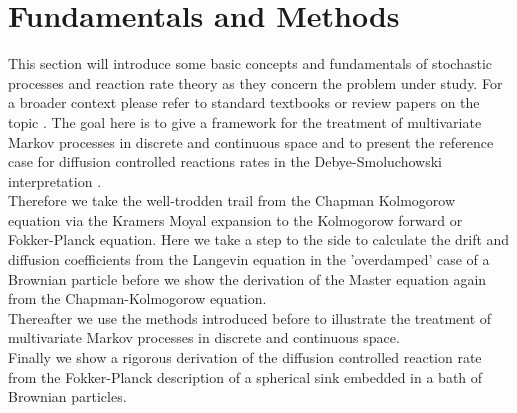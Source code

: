 
\section{Fundamentals and Methods}
\label{Short_Introduction_to_Stochastic_Processes}
This section will introduce some basic concepts and fundamentals of stochastic processes and reaction rate theory as they concern the problem under study. For a broader context please refer to standard textbooks \cite{VanKampen1992} or review papers on the topic \cite{Calef1983a, Bressloff2013}. The goal here is to give a framework for the treatment of multivariate Markov processes in discrete and continuous space and to present the reference case for diffusion controlled reactions rates in the Debye-Smoluchowski interpretation \cite{Smoluchowski1917a, Debye1942}. \\
Therefore we take the well-trodden trail from the Chapman Kolmogorow equation via the Kramers Moyal expansion to the Kolmogorow forward or Fokker-Planck equation. Here we take a step to the side to calculate the drift and diffusion coefficients from the Langevin equation in the 'overdamped' case of a Brownian particle before we show the derivation of the Master equation again from the Chapman-Kolmogorow equation.\\
Thereafter we use the methods introduced before to illustrate the treatment of multivariate Markov processes in discrete and continuous space. \\
Finally we show a rigorous derivation of the diffusion controlled reaction rate from the Fokker-Planck description of a spherical sink embedded in a bath of Brownian particles.
